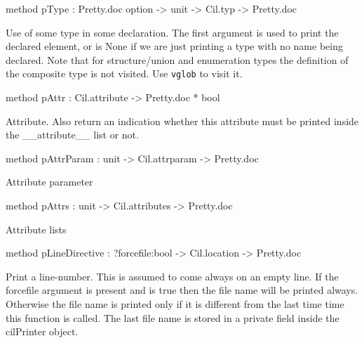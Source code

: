 \documentclass[11pt]{article}
\begin{document}
\begin{ocamldocobjectend}
\begin{ocamldocdescription}
\end{ocamldocdescription}


\label{method:Cil.cilPrinter.pType}\begin{ocamldoccode}
method pType : Pretty.doc option -> unit -> Cil.typ -> Pretty.doc
\end{ocamldoccode}
\begin{ocamldocdescription}
Use of some type in some declaration. The first argument is used to print 
 the declared element, or is None if we are just printing a type with no 
 name being declared. Note that for structure/union and enumeration types 
 the definition of the composite type is not visited. Use {\tt{vglob}} to 
 visit it.


\end{ocamldocdescription}


\label{method:Cil.cilPrinter.pAttr}\begin{ocamldoccode}
method pAttr : Cil.attribute -> Pretty.doc * bool
\end{ocamldoccode}
\begin{ocamldocdescription}
Attribute. Also return an indication whether this attribute must be 
 printed inside the \_\_attribute\_\_ list or not.


\end{ocamldocdescription}


\label{method:Cil.cilPrinter.pAttrParam}\begin{ocamldoccode}
method pAttrParam : unit -> Cil.attrparam -> Pretty.doc
\end{ocamldoccode}
\begin{ocamldocdescription}
Attribute parameter


\end{ocamldocdescription}


\label{method:Cil.cilPrinter.pAttrs}\begin{ocamldoccode}
method pAttrs : unit -> Cil.attributes -> Pretty.doc
\end{ocamldoccode}
\begin{ocamldocdescription}
Attribute lists


\end{ocamldocdescription}


\label{method:Cil.cilPrinter.pLineDirective}\begin{ocamldoccode}
method pLineDirective : ?forcefile:bool -> Cil.location -> Pretty.doc
\end{ocamldoccode}
\begin{ocamldocdescription}
Print a line-number. This is assumed to come always on an empty line. 
 If the forcefile argument is present and is true then the file name 
 will be printed always. Otherwise the file name is printed only if it 
 is different from the last time time this function is called. The last 
 file name is stored in a private field inside the cilPrinter object.



\end{ocamldocdescription}
\end{ocamldocobjectend}
\end{document}
